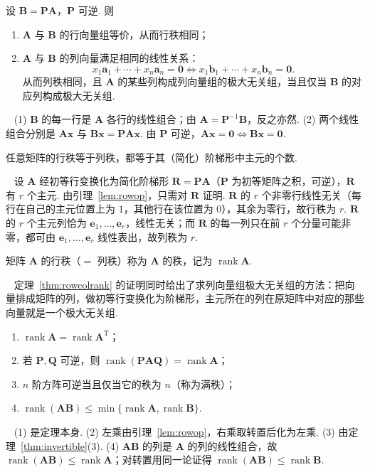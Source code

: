 \documentclass[lang=cn,10.5pt,scheme=chinese,toc=twocol,section,chinesefont=nofont,
twoside,citestyle=gb7714-2015,bibstyle=gb7714-2015]{elegantbook}
\DeclareRobustCommand{\textbf}[1]{{\lnsemiboldlatin\lnsemiboldcjk #1}}
\newcommand{\vv}[1]{\boldsymbol{#1}}
\newcommand{\zero}{\boldsymbol{0}}          %
\newcommand{\trans}{\mathrm{T}}             %
\numberwithin{equation}{section}   %
\newcommand{\rk}{\operatorname{rank}}       %
\newcommand*{\lnlabel}[1]{{\sffamily\bfseries\color{black}#1}}
\renewenvironment{proof}{%
	\par\noindent\lnlabel{\proofname}\;\ \color{black!90}\cfs}{\par}
\renewenvironment{remark}{\noindent\lnlabel{\remarkname}\ }{\par}
\begin{document}
\begin{lemma}
  \label{lem:rowop}
  设 $\vv B=\vv{PA}$，$\vv P$ 可逆. 则
  \begin{enumerate}
    \item $\vv A$ 与 $\vv B$ 的行向量组等价，从而行秩相同；
    \item $\vv A$ 与 $\vv B$ 的列向量满足相同的线性关系：
          \[x_1\vv a_1+\cdots+x_n\vv a_n=\zero\iff x_1\vv b_1+\cdots+x_n\vv b_n=\zero.\]
          从而列秩相同，且 $\vv A$ 的某些列构成列向量组的极大无关组，当且仅当 $\vv B$ 的对应列构成极大无关组.
  \end{enumerate}
\end{lemma}
\begin{proof}
  (1) $\vv B$ 的每一行是 $\vv A$ 各行的线性组合；由 $\vv A=\vv P^{-1}\vv B$，反之亦然.
  (2) 两个线性组合分别是 $\vv{Ax}$ 与 $\vv{Bx}=\vv{PAx}$. 由 $\vv P$ 可逆，$\vv{Ax}=\zero\iff\vv{Bx}=\zero$.
\end{proof}

\begin{theorem}
  \label{thm:rowcolrank}
  任意矩阵的行秩等于列秩，都等于其（简化）阶梯形中主元的个数.
\end{theorem}
\begin{proof}
  设 $\vv A$ 经初等行变换化为简化阶梯形 $\vv R=\vv{PA}$（$\vv P$ 为初等矩阵之积，可逆），$\vv R$ 有 $r$ 个主元. 由引理~\ref{lem:rowop}，只需对 $\vv R$ 证明. $\vv R$ 的 $r$ 个非零行线性无关（每行在自己的主元位置上为 $1$，其他行在该位置为 $0$），其余为零行，故行秩为 $r$. $\vv R$ 的 $r$ 个主元列恰为 $\vv e_1,\ldots,\vv e_r$，线性无关；而 $\vv R$ 的每一列只在前 $r$ 个分量可能非零，都可由 $\vv e_1,\ldots,\vv e_r$ 线性表出，故列秩为 $r$.
\end{proof}

\begin{definition}
  矩阵 $\vv A$ 的行秩（$=$ 列秩）称为 $\vv A$ 的\textbf{秩}，记为 $\rk\vv A$.
\end{definition}

\begin{remark}
  定理~\ref{thm:rowcolrank} 的证明同时给出了求列向量组极大无关组的方法：把向量排成矩阵的列，做初等行变换化为阶梯形，主元所在的列在\textbf{原矩阵}中对应的那些向量就是一个极大无关组.
\end{remark}

\begin{corollary}
  \label{cor:rankinvariant}
  \begin{enumerate}
    \item $\rk\vv A=\rk\vv A^\trans$；
    \item 若 $\vv P,\vv Q$ 可逆，则 $\rk(\vv{PAQ})=\rk\vv A$；
    \item $n$ 阶方阵可逆当且仅当它的秩为 $n$（称为\textbf{满秩}）；
    \item $\rk(\vv{AB})\le\min\{\rk\vv A,\rk\vv B\}$.
  \end{enumerate}
\end{corollary}
\begin{proof}
  (1) 是定理本身. (2) 左乘由引理~\ref{lem:rowop}，右乘取转置后化为左乘. (3) 由定理~\ref{thm:invertible}(3). (4) $\vv{AB}$ 的列是 $\vv A$ 的列的线性组合，故 $\rk(\vv{AB})\le\rk\vv A$；对转置用同一论证得 $\rk(\vv{AB})\le\rk\vv B$.
\end{proof}
\end{document}
